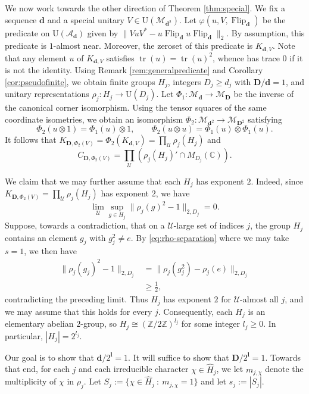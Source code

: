 \documentclass[12pt]{amsart}
\numberwithin{equation}{section}
\theoremstyle{definition}
\newcommand{\C}{\mathbb{C}}
\def\cal{\mathcal}
\def\M{\mathcal{M}}
\DeclareMathOperator{\tr}{tr}
\newcommand\cU{{\cal U}}
\def \M{\mathcal{M}}
\def \A{\mathcal{A}}
\begin{document}
We now work towards the other direction of Theorem \ref{thm:special}.  We fix a sequence $\mathbf{d}$ and a special unitary $V\in \mathrm{U}(\M_{\mathbf{d}^2})$.  Let $\varphi(u,V,\operatorname{Flip}_\mathbf{d})$ be the predicate on $\mathrm{U}(\A_\mathbf{d})$ given by $\|VuV^*-u\operatorname{Flip}_\mathbf{d}u\operatorname{Flip}_\mathbf{d}\|_2$.  By assumption, this predicate is $1$-almost near.  Moreover,  the zeroset of this predicate is $K_{\mathbf{d},V}$.  Note that any element $u$ of $K_{\mathbf{d},V}$ satisfies $\tr(u)=\tr(u)^2$, whence has trace $0$ if it is not the identity.  Using Remark \ref{rem:generalpredicate} and Corollary \ref{cor:pseudofinite}, we obtain finite groups $H_j$, integers $D_j\geq d_j$ with $\mathbf{D}/\mathbf{d}=1$, and unitary representations $\rho_j:H_j\to \mathrm{U}(D_j)$. 
Let $\Phi_1:\M_{\mathbf d}\to\M_{\mathbf D}$
be the inverse of the canonical corner isomorphism.
Using the tensor squares of the same coordinate
isometries, we obtain an isomorphism
$\Phi_2:\M_{\mathbf d^2}\to\M_{\mathbf D^2}$
satisfying
\[
\Phi_2(u\otimes1)=\Phi_1(u)\otimes1,
\qquad
\Phi_2(u\otimes u)=\Phi_1(u)\otimes\Phi_1(u).
\]
It follows that
$K_{\mathbf D,\Phi_2(V)}
=\Phi_{2}(K_{\mathbf d,V})
=\prod_{\mathcal U}\rho_j(H_j)$ and \[C_{\mathbf{D},\Phi_2(V)}=\prod_\cU (\rho_j(H_j)'\cap M_{D_j}(\C)).\]

We claim that we may further assume that each $H_j$ has
exponent $2$. Indeed, since $K_{\mathbf D,\Phi_2(V)}
=\prod_{\mathcal U}\rho_j(H_j)$ has exponent $2$, we have
\[
\lim_{\mathcal U}
\sup_{g\in H_j}
\|\rho_j(g)^2-1\|_{2,D_j}=0.
\]
Suppose, towards a contradiction, that on a
$\mathcal U$-large set of indices $j$, the group $H_j$
contains an element $g_j$ with $g_j^2\ne e$.
By \eqref{eq:rho-separation} { where we may take $s=1$}, we then have
\[
\begin{aligned}
\|\rho_j(g_j)^2-1\|_{2,D_j}
&=\|\rho_j(g_j^2)-\rho_j(e)\|_{2,D_j}\\
&\ge\frac{1}{2},
\end{aligned}
\]
contradicting the preceding limit.
Thus $H_j$ has exponent $2$ for $\mathcal U$-almost
all $j$, and we may assume that this holds for every
$j$. Consequently, each $H_j$ is an elementary
abelian $2$-group, so $H_j\cong(\mathbb Z/2\mathbb Z)^{l_j}$ for some integer $l_j\ge0$. In particular, $|H_j|=2^{l_j}$.  

Our goal is to show that $\mathbf{d}/2^{\mathbf{l}}=1$.  It will suffice to show that $\mathbf{D}/2^{\mathbf{l}}=1$.  Towards that end, for each $j$ and each irreducible character $\chi\in \hat H_j$, we let $m_{j,\chi}$ denote the multiplicity of $\chi$ in $\rho_j$.  Let $S_j:=\{\chi\in \hat H_j \ : \ m_{j,\chi}=1\}$ and let $s_j:=|S_j|$.
\end{document}
